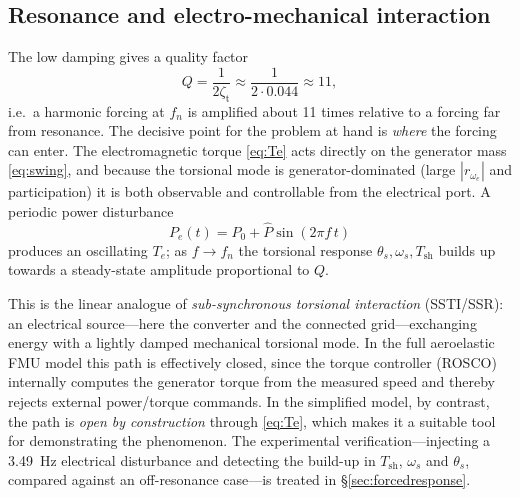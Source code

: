 \subsection{Resonance and electro-mechanical interaction}
\label{subsec:resonance}

The low damping gives a quality factor
\begin{equation}
  Q = \frac{1}{2\zeta_{\mathrm{t}}} \approx \frac{1}{2 \cdot 0.044} \approx 11,
  \label{eq:Q}
\end{equation}
i.e.\ a harmonic forcing at $f_n$ is amplified about \num{11} times relative to
a forcing far from resonance. The decisive point for the problem at hand is
\emph{where} the forcing can enter. The electromagnetic torque \eqref{eq:Te}
acts directly on the generator mass \eqref{eq:swing}, and because the torsional
mode is generator-dominated (large $|r_{\omega_e}|$ and participation) it is
both observable and controllable from the electrical port. A periodic power
disturbance
\begin{equation}
  P_e(t) = P_0 + \hat{P}\sin(2\pi f\, t)
  \label{eq:Pe-forcing}
\end{equation}
produces an oscillating $T_e$; as $f \to f_n$ the torsional response
$\theta_s,\omega_s,T_{\mathrm{sh}}$ builds up towards a steady-state amplitude
proportional to $Q$.

This is the linear analogue of \emph{sub-synchronous torsional interaction}
(SSTI/SSR): an electrical source---here the converter and the connected
grid---exchanging energy with a lightly damped mechanical torsional mode. In
the full aeroelastic FMU model this path is effectively closed, since the
torque controller (ROSCO) internally computes the generator torque from the
measured speed and thereby rejects external power/torque commands. In the
simplified model, by contrast, the path is \emph{open by construction} through
\eqref{eq:Te}, which makes it a suitable tool for demonstrating the phenomenon.
The experimental verification---injecting a \SI{3.49}{\hertz} electrical
disturbance and detecting the build-up in $T_{\mathrm{sh}}$, $\omega_s$ and
$\theta_s$, compared against an off-resonance case---is treated in
\S\ref{sec:forcedresponse}.
